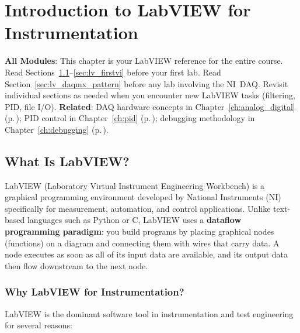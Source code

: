 
\chapter{Introduction to LabVIEW for Instrumentation}
\label{ch:labview}

\begin{tipbox}
\textbf{All Modules}: This chapter is your LabVIEW reference for the entire course. Read Sections~\ref{sec:lv_what}--\ref{sec:lv_firstvi} before your first lab. Read Section~\ref{sec:lv_daqmx_pattern} before any lab involving the NI~DAQ. Revisit individual sections as needed when you encounter new LabVIEW tasks (filtering, PID, file I/O). \textbf{Related}: DAQ hardware concepts in Chapter~\ref{ch:analog_digital} (p.\,\pageref{ch:analog_digital}); PID control in Chapter~\ref{ch:pid} (p.\,\pageref{ch:pid}); debugging methodology in Chapter~\ref{ch:debugging} (p.\,\pageref{ch:debugging}).
\end{tipbox}

\section{What Is LabVIEW?}
\label{sec:lv_what}

LabVIEW (Laboratory Virtual Instrument Engineering Workbench) is a graphical programming environment developed by National Instruments (NI) specifically for measurement, automation, and control applications. Unlike text-based languages such as Python or C, LabVIEW uses a \textbf{dataflow programming paradigm}: you build programs by placing graphical nodes (functions) on a diagram and connecting them with wires that carry data. A node executes as soon as all of its input data are available, and its output data then flow downstream to the next node.


\subsection{Why LabVIEW for Instrumentation?}

LabVIEW is the dominant software tool in instrumentation and test engineering for several reasons:

